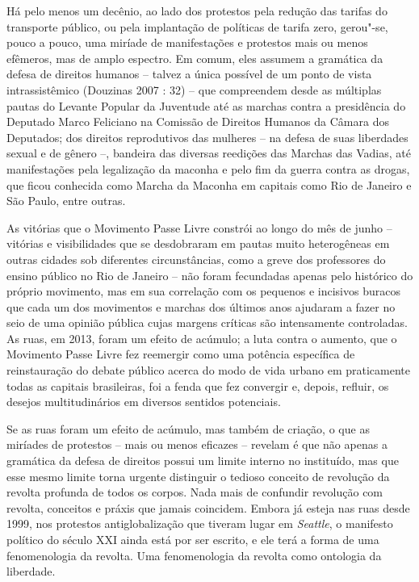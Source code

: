 Há pelo menos um decênio, ao lado dos protestos pela redução das tarifas
do transporte público, ou pela implantação de políticas de tarifa zero,
gerou"-se, pouco a pouco, uma miríade de manifestações e protestos mais
ou menos efêmeros, mas de amplo espectro. Em comum, eles assumem a
gramática da defesa de direitos humanos -- talvez a única possível de um
ponto de vista intrassistêmico (Douzinas 2007 : 32) -- que compreendem
desde as múltiplas pautas do Levante Popular da Juventude até as marchas
contra a presidência do Deputado Marco Feliciano na Comissão de Direitos
Humanos da Câmara dos Deputados; dos direitos reprodutivos das mulheres
-- na defesa de suas liberdades sexual e de gênero --, bandeira das
diversas reedições das Marchas das Vadias, até manifestações pela
legalização da maconha e pelo fim da guerra contra as drogas, que ficou
conhecida como Marcha da Maconha em capitais como Rio de Janeiro e São
Paulo, entre outras.

As vitórias que o Movimento Passe Livre constrói ao longo do mês de
junho -- vitórias e visibilidades que se desdobraram em pautas muito
heterogêneas em outras cidades sob diferentes circunstâncias, como a
greve dos professores do ensino público no Rio de Janeiro -- não foram
fecundadas apenas pelo histórico do próprio movimento, mas em sua
correlação com os pequenos e incisivos buracos que cada um dos
movimentos e marchas dos últimos anos ajudaram a fazer no seio de uma
opinião pública cujas margens críticas são intensamente controladas. As
ruas, em 2013, foram um efeito de acúmulo; a luta contra o aumento, que
o Movimento Passe Livre fez reemergir como uma potência específica de
reinstauração do debate público acerca do modo de vida urbano em
praticamente todas as capitais brasileiras, foi a fenda que fez
convergir e, depois, refluir, os desejos multitudinários em diversos
sentidos potenciais.

Se as ruas foram um efeito de acúmulo, mas também de criação, o que as
miríades de protestos -- mais ou menos eficazes -- revelam é que não
apenas a gramática da defesa de direitos possui um limite interno no
instituído, mas que esse mesmo limite torna urgente distinguir o tedioso
conceito de revolução da revolta profunda de todos os corpos. Nada mais
de confundir revolução com revolta, conceitos e práxis que jamais
coincidem. Embora já esteja nas ruas desde 1999, nos protestos
antiglobalização que tiveram lugar em \emph{Seattle}, o manifesto
político do século XXI ainda está por ser escrito, e ele terá a forma de
uma fenomenologia da revolta. Uma fenomenologia da revolta como
ontologia da liberdade.

